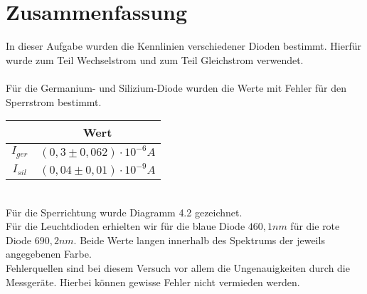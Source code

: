 \chapter{Zusammenfassung}
    In dieser Aufgabe wurden die Kennlinien verschiedener Dioden bestimmt. Hierfür wurde zum Teil Wechselstrom und zum Teil Gleichstrom verwendet.\\
    \\
    Für die Germanium- und Silizium-Diode wurden die Werte mit Fehler für den Sperrstrom bestimmt.\\
    
    \begin{center}
    	\begin{tabular}{c|c}
    		 & Wert \\ \hline
             $I_{ger}$ &  $(0,3 \pm 0,062) \cdot 10^{-6} A$\\
             $I_{sil}$ & $(0,04 \pm 0,01) \cdot 10^{-9} A$
    	\end{tabular}
    \end{center}
    \ \\
    Für die Sperrichtung wurde Diagramm 4.2 gezeichnet.
    \\
    Für die Leuchtdioden erhielten wir für die blaue Diode $460,1 nm$ für die rote Diode $690,2 nm$. Beide Werte langen innerhalb des Spektrums der jeweils angegebenen Farbe.
    \\
    
    Fehlerquellen sind bei diesem Versuch vor allem die Ungenauigkeiten durch die Messgeräte. Hierbei können gewisse Fehler nicht vermieden werden.
	\pagebreak